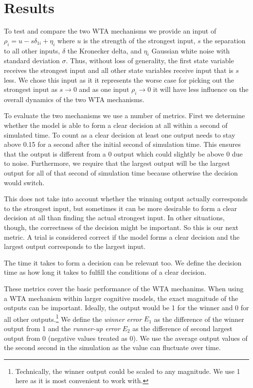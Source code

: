 \documentclass[10pt,letterpaper]{article}
\begin{document}
\section{Results}
To test and compare the two WTA mechanisms we provide an input of $\rho_i 
= u - s \delta_{1i} + \eta_i$ where $u$ is the strength of the strongest input, 
$s$ the separation to all other inputs, $\delta$ the Kronecker delta, and 
$\eta_i$ Gaussian white noise with standard deviation $\sigma$. Thus, without 
loss of generality, the first state variable receives the strongest input and 
all other state variables receive input that is $s$ less. We chose this input as 
it it represents the worse case for picking out the strongest input as $s 
\rightarrow 0$ and as one input $\rho_i \rightarrow 0$ it will have less 
influence on the overall dynamics of the two WTA mechanisms.

To evaluate the two mechanisms we use a number of metrics. First we determine 
whether the model is able to form a clear decision at all within a second of 
simulated time. To count as a clear decision at least one output needs to stay 
above 0.15 for a second after the initial second of simulation time. This 
ensures that the output is different from a 0 output which could slightly be 
above 
0 due to noise. Furthermore, we require that the largest output will be the 
  largest output for all of that second of simulation time because otherwise the 
  decision would switch.

This does not take into account whether the winning output actually corresponds 
to the strongest input, but sometimes it can be more desirable to form a clear 
decision at all than finding the actual strongest input. In other situations, 
though, the correctness of the decision might be important. So this is our next 
metric. A trial is considered correct if the model forms a clear decision and 
the largest output corresponds to the largest input.

The time it takes to form a decision can be relevant too. We define the decision 
time as how long it takes to fulfill the conditions of a clear decision.

These metrics cover the basic performance of the WTA mechanims. When using a WTA 
mechanism within larger cognitive models, the exact magnitude of the outputs can 
be important. Ideally, the output would be 1 for the winner and 0 for all other 
outputs.\footnote{Technically, the winner output could be scaled to any 
    magnitude. We use 1 here as it is most convenient to work with.} We define 
the \emph{winner error} $E_1$ as the difference of the winner output from 1 and 
the \emph{runner-up error} $E_2$ as the difference of second largest output from 
0 (negative values treated as 0). We use the average output values of the second 
  second in the simulation as the value can fluctuate over time.
\end{document}
